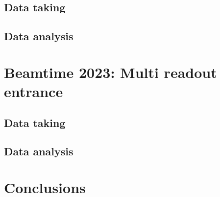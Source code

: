 \begin{refsection}
\subsection{Data taking}
\subsection{Data analysis}
\section{Beamtime 2023: Multi readout entrance}
\subsection{Data taking}
\subsection{Data analysis}

\section{Conclusions}

\printbibliography[title=ibliography on muEDM entrance detector]
\end{refsection}